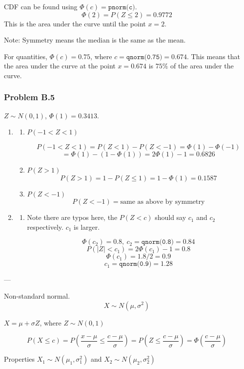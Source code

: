 \documentclass{article}
\newcommand{\var}{\sigma^2}
\begin{document}
CDF can be found using $\Phi(c) = \texttt{pnorm(c)}$.
$$\Phi(2) = P(Z \leq 2) = 0.9772$$ This is the area under the curve until the point $x=2$.

Note: Symmetry means the median is the same as the mean.

For quantities, $\Phi(c) = 0.75$, where $c=\texttt{qnorm(0.75)}=0.674$. This means that the area under the curve at the point $x=0.674$ is $75\%$ of the area under the curve.

\subsubsection*{Problem B.5}

$Z \sim N(0,1)$, $\Phi(1)=0.3413$.

\begin{enumerate}
\item \begin{enumerate}
\item $P(-1 < Z < 1)$ 

$$P(-1 < Z < 1) = P(Z < 1) - P(Z < -1) = \Phi(1) - \Phi(-1) $$ $$ = \Phi(1) - (1-\Phi(1)) = 2\Phi(1) - 1 = 0.6826$$
\item $P(Z > 1)$
$$P(Z > 1) = 1-P(Z \leq 1) = 1-\Phi(1) = 0.1587$$
\item $P(Z < -1)$
$$ P(Z < -1) = \text{same as above by symmetry}$$

\end{enumerate}
\item \begin{enumerate} 
\item  Note there are typos here, the $P(Z<c)$ should say $c_1$ and $c_2$ respectively. $c_1$ is larger.

$$\Phi(c_2) = 0.8,\ c_2 = \texttt{qnorm(0.8)} = 0.84$$
$$P(|Z|<c_1) = 2\Phi(c_1) - 1 = 0.8$$
$$\Phi(c_1) = 1.8/2 = 0.9$$
$$c_1 = \texttt{qnorm(0.9)} = 1.28$$


\end{enumerate}
\end{enumerate}

---

Non-standard normal. $$ X \sim N(\mu, \var)$$

$X = \mu + \sigma Z$, where $Z \sim N(0,1)$

$$P(X \leq c) = P(\frac{x-\mu}{\sigma} \leq \frac{c-\mu}{\sigma} ) = P(Z \leq \frac{c-\mu}{\sigma}) = \Phi(\frac{c-\mu}{\sigma})$$

Properties $X_1 \sim N(\mu_1, \var_1)$ and $X_2 \sim N(\mu_2, \var_2) $
\end{document}
